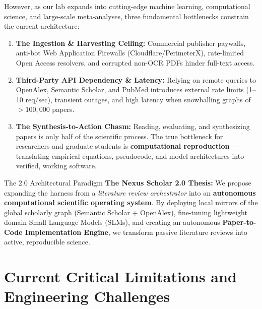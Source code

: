 \documentclass[10pt,a4paper]{article}
\begin{document}
However, as our lab expands into cutting-edge machine learning, computational science, and large-scale meta-analyses, three fundamental bottlenecks constrain the current architecture:
\begin{enumerate}[leftmargin=1.4em, itemsep=2pt, topsep=1pt]
    \item \textbf{The Ingestion \& Harvesting Ceiling:} Commercial publisher paywalls, anti-bot Web Application Firewalls (Cloudflare/PerimeterX), rate-limited Open Access resolvers, and corrupted non-OCR PDFs hinder full-text access.
    \item \textbf{Third-Party API Dependency \& Latency:} Relying on remote queries to OpenAlex, Semantic Scholar, and PubMed introduces external rate limits (1--10 req/sec), transient outages, and high latency when snowballing graphs of $>100{,}000$ papers.
    \item \textbf{The Synthesis-to-Action Chasm:} Reading, evaluating, and synthesizing papers is only half of the scientific process. The true bottleneck for researchers and graduate students is \textbf{computational reproduction}---translating empirical equations, pseudocode, and model architectures into verified, working software.
\end{enumerate}

\begin{visionbox}{The 2.0 Architectural Paradigm}
\textbf{The Nexus Scholar 2.0 Thesis:} We propose expanding the harness from a \textit{literature review orchestrator} into an \textbf{autonomous computational scientific operating system}. By deploying local mirrors of the global scholarly graph (Semantic Scholar + OpenAlex), fine-tuning lightweight domain Small Language Models (SLMs), and creating an autonomous \textbf{Paper-to-Code Implementation Engine}, we transform passive literature reviews into active, reproducible science.
\end{visionbox}

\vspace{-2pt}

\section{Current Critical Limitations and Engineering Challenges}
\end{document}
